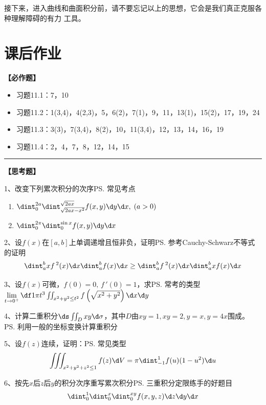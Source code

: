 接下来，进入曲线和曲面积分前，请不要忘记以上的思想，它会是我们真正克服各种理解障碍的有力
工具。

\newpage

\section*{课后作业}

{\bf 【必作题】}

\begin{itemize}
  \setlength{\itemindent}{1cm}
  \item 习题11.1：7，10
  \item 习题11.2：1(3,4)，4(2,3)，5，6(2)，7(1)，9，11，13(1)，15(2)，17，19，24
  \item 习题11.3：3(3)，7(3,4)，8(2)，10，11(3,4)，12，13，14，16，19
  \item 习题11.4：2，4，7，8，12，14，15
\end{itemize}

\bigskip

\hrule

\bigskip

{\bf 【思考题】}

1、改变下列累次积分的次序\ps{常见考点}
\begin{enumerate}[(1)]
  \setlength{\itemindent}{1cm}
  \item $\dint_0^{2a}\dint_{\sqrt{2ax-x^2}}^{\sqrt{2ax}}
  f(x,y)\d y\d x,\;(a>0)$ 
  \item $\dint_0^{2\pi}\dint_0^{\sin x}f(x,y)\d y\d x$
\end{enumerate}

2、设$f(x)$在$[a,b]$上单调递增且恒非负，证明\ps{参考Cauchy-Schwarz不等式的证明}
$${\dint_a^b xf\,^2(x)\d x}{\dint_a^b f(x)\d x}\geq
{\dint_a^b f\,^2(x)\d x}{\dint_a^b xf(x)\d x}$$

3、设$f(x)$可微，$f(0)=0,\,f\,'(0)=1$，求\ps{常考的类型}
$\lim\limits_{t\to 0^+}\df 1{\pi t^3}
\iint_{x^2+y^2\leq t^2}f\left(
\sqrt{x^2+y^2}\right)\d x\d y$

4、计算二重积分$\ds\iint_D xy\d\sigma$，其中$D$由$xy=1,xy=2,y=x,y=4x$围成。
\ps{利用一般的坐标变换计算重积分} 

5、设$f(z)$连续，证明：\ps{常见类型}
$$\iiint_{x^2+y^2+z^2\leq 1}f(z)\d V=\pi\dint_{-1}^1f(u)(1-u^2)\d u$$

6、按先$x$后$z$后$y$的积分次序重写累次积分\ps{三重积分定限练手的好题目}
$$\dint_0^1\dint_0^x\dint_0^{xy}f(x,y,z)\d z\d y\d x$$

